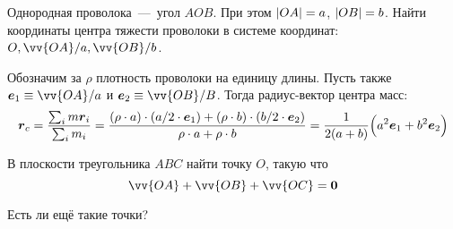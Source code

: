 \documentclass[a4paper,12pt]{article}
\begin{document}
  
  \begin{problem}[1.39]
    Однородная проволока~---~угол $AOB$.
    При этом $|OA| \hm= a$, $|OB| \hm= b$.
    Найти координаты центра тяжести проволоки в системе координат: $O, \vv{OA}/a, \vv{OB}/b$.
  \end{problem}
  
  \begin{solution}
    Обозначим за $\rho$ плотность проволоки на единицу длины.
    Пусть также $\bds e_1 \hm\equiv \vv{OA}/a$ и $\bds e_2 \hm\equiv \vv{OB}/B$.
    Тогда радиус-вектор центра масс:
    \[
      \boldsymbol r_c
      = \frac{\sum\nolimits_i m \boldsymbol r_i}{\sum\nolimits_i m_i}
      = \frac{(\rho \cdot a) \cdot (a/2 \cdot \boldsymbol e_1) + (\rho \cdot b) \cdot (b/2 \cdot \boldsymbol e_2)}{\rho \cdot a + \rho \cdot b}
      = \frac{1}{2(a + b)} \Bigl(a^2 \boldsymbol e_1 + b^2 \boldsymbol e_2\Bigr)
    \]
  \end{solution}
  
  
  \begin{problem}[1.37]
    В плоскости треугольника $ABC$ найти точку $O$, такую что
    \[
      \vv{OA} + \vv{OB} + \vv{OC} = \bds 0
    \]
    
    Есть ли ещё такие точки?
  \end{problem}
  
\end{document}
